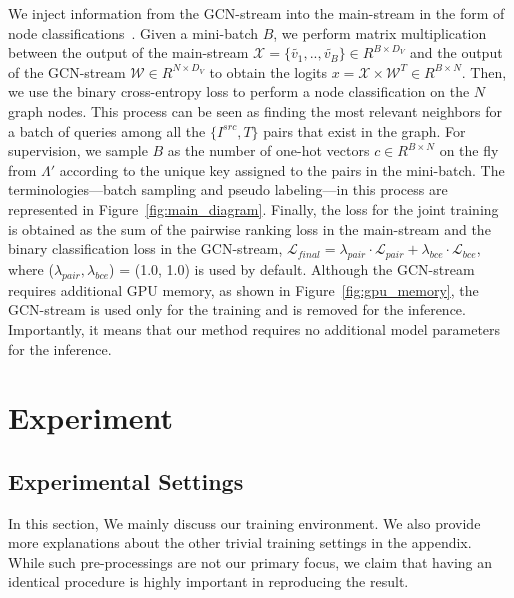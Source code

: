 \documentclass[10pt,twocolumn,letterpaper]{article}
\begin{document}
We inject information from the GCN-stream into the main-stream in the form of node classifications~\cite{chen2019multi}. Given a mini-batch $B$, we perform matrix multiplication between the output of the main-stream $\mathcal{X}=\{\tilde{v_1}, .. , \tilde{v_B}\} \in R^{B \times D_V}$ and the output of the GCN-stream $\mathcal{W} \in R^{N \times D_V}$ to obtain the logits $x = \mathcal{X} \times \mathcal{W}^T \in R^{B \times N}$. Then, we use the binary cross-entropy loss to perform a node classification on the $N$ graph nodes. This process can be seen as finding the most relevant neighbors for a batch of queries among all the $\{I^{src}, T\}$ pairs that exist in the graph. For supervision, we sample $B$ as the number of one-hot vectors $c \in R^{B \times N}$ on the fly from $\Lambda'$ according to the unique key assigned to the pairs in the mini-batch. The terminologies---batch sampling and pseudo labeling---in this process are represented in Figure~\ref{fig:main_diagram}. Finally, the loss for the joint training is obtained as the sum of the pairwise ranking loss in the main-stream and the binary classification loss in the GCN-stream, $\mathcal{L}_{final} = \lambda_{pair} \cdot \mathcal{L}_{pair} + \lambda_{bce} \cdot \mathcal{L}_{bce}$, where ($\lambda_{pair}, \lambda_{bce}$) = (1.0, 1.0) is used by default. Although the GCN-stream requires additional GPU memory, as shown in Figure~\ref{fig:gpu_memory}, the GCN-stream is used only for the training and is removed for the inference. Importantly, it means that our method requires no additional model parameters for the inference.

\section{Experiment}

\subsection{Experimental Settings}
In this section, We mainly discuss our training environment. We also provide more explanations about the other trivial training settings in the appendix. While such pre-processings are not our primary focus, we claim that having an identical procedure is highly important in reproducing the result.
\end{document}
